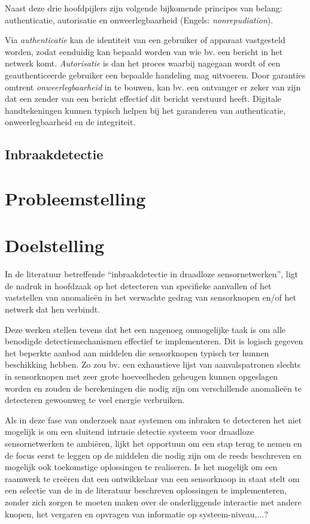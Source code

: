 Naast deze drie hoofdpijlers zijn volgende bijkomende principes van belang:
authenticatie, autorisatie en onweerlegbaarheid (Engels: \emph{nonrepudiation}).

Via \emph{authenticatie} kan de identiteit van een gebruiker of apparaat
vastgesteld worden, zodat eenduidig kan bepaald worden van wie bv. een bericht
in het netwerk komt. \emph{Autorisatie} is dan het proces waarbij nagegaan
wordt of een geauthenticeerde gebruiker een bepaalde handeling mag uitvoeren.
Door garanties omtrent \emph{onweerlegbaarheid} in te bouwen, kan bv. een
ontvanger er zeker van zijn dat een zender van een bericht effectief dit
bericht verstuurd heeft. Digitale handtekeningen kunnen typisch helpen bij het
garanderen van authenticatie, onweerlegbaarheid en de integriteit.

\TODO

\subsection{Inbraakdetectie}
\label{subsection:detection}

\TODO

\section{Probleemstelling}
\label{section:probleem}

\TODO

\section{Doelstelling}
\label{section:doelstelling}

In de literatuur betreffende ``inbraakdetectie in draadloze sensornetwerken'',
ligt de nadruk in hoofdzaak op het detecteren van specifieke aanvallen of het
vaststellen van anomalie\"en in het verwachte gedrag van sensorknopen en/of het
netwerk dat hen verbindt.

Deze werken stellen tevens dat het een nagenoeg onmogelijke taak is om alle
benodigde detectiemechanismen effectief te implementeren. Dit is logisch
gegeven het beperkte aanbod aan middelen die sensorknopen typisch ter hunnen
beschikking hebben. Zo zou bv. een exhaustieve lijst van aanvalspatronen
slechts in sensorknopen met zeer grote hoeveelheden geheugen kunnen opgeslagen
worden en zouden de berekeningen die nodig zijn om verschillende anomalie\"en
te detecteren gewoonweg te veel energie verbruiken.

Als in deze fase van onderzoek naar systemen om inbraken te detecteren het niet
mogelijk is om een sluitend intrusie detectie systeem voor draadloze
sensornetwerken te ambi\"eren, lijkt het opportuun om een stap terug te nemen
en de focus eerst te leggen op de middelen die nodig zijn om de reeds
beschreven en mogelijk ook toekomstige oplossingen te realiseren. Is het
mogelijk om een raamwerk te cre\"eren dat een ontwikkelaar van een sensorknoop
in staat stelt om een selectie van de in de literatuur beschreven oplossingen
te implementeren, zonder zich zorgen te moeten maken over de onderliggende
interactie met andere knopen, het vergaren en opvragen van informatie op
systeem-niveau,...?

